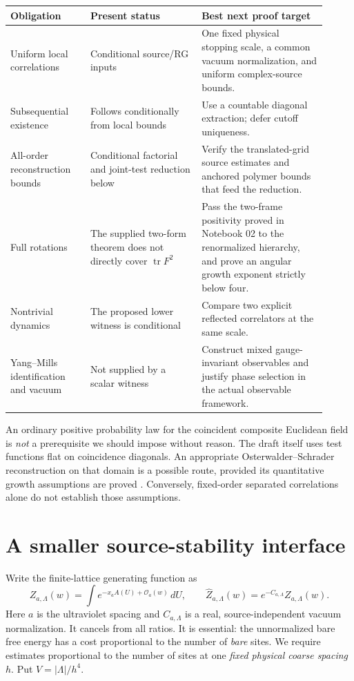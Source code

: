 \documentclass[11pt]{article}
\theoremstyle{remark}
\newcommand{\tr}{\operatorname{tr}}
\begin{document}
\begin{center}
\small
\begin{tabular}{p{0.23\linewidth}p{0.32\linewidth}p{0.36\linewidth}}
\toprule
Obligation & Present status & Best next proof target\\
\midrule
Uniform local correlations &
Conditional source/RG inputs &
One fixed physical stopping scale, a common vacuum normalization, and
uniform complex-source bounds.\\[3pt]
Subsequential existence &
Follows conditionally from local bounds &
Use a countable diagonal extraction; defer cutoff uniqueness.\\[3pt]
All-order reconstruction bounds &
Conditional factorial and joint-test reduction below &
Verify the translated-grid source estimates and anchored polymer
bounds that feed the reduction.\\[3pt]
Full rotations &
The supplied two-form theorem does not directly cover $\tr F^2$ &
Pass the two-frame positivity proved in Notebook 02 to the renormalized
hierarchy, and prove an angular growth exponent strictly below four.\\[3pt]
Nontrivial dynamics &
The proposed lower witness is conditional &
Compare two explicit reflected correlators at the same scale.\\[3pt]
Yang--Mills identification and vacuum &
Not supplied by a scalar witness &
Construct mixed gauge-invariant observables and justify phase selection
in the actual observable framework.\\
\bottomrule
\end{tabular}
\end{center}

An ordinary positive probability law for the coincident composite Euclidean
field is \emph{not} a prerequisite we should impose without reason.
The draft itself uses test functions flat on coincidence diagonals.
An appropriate Osterwalder--Schrader reconstruction on that domain is a
possible route, provided its quantitative growth assumptions are proved
\cite{os2,seiler}. Conversely, fixed-order separated correlations alone do
not establish those assumptions.

\section{A smaller source-stability interface}

Write the finite-lattice generating function as
\[
 Z_{a,\Lambda}(w)=\int e^{-x_a A(U)+\mathcal O_a(w)}\,dU,
 \qquad \widehat Z_{a,\Lambda}(w)=e^{-C_{a,\Lambda}}Z_{a,\Lambda}(w).
\]
Here $a$ is the ultraviolet spacing and $C_{a,\Lambda}$ is a real,
source-independent vacuum normalization. It cancels from all ratios.
It is essential: the unnormalized bare free energy has a cost proportional
to the number of \emph{bare} sites. We require estimates proportional to
the number of sites at one \emph{fixed physical coarse spacing} $h$.
Put $V=|\Lambda|/h^4$.
\end{document}
